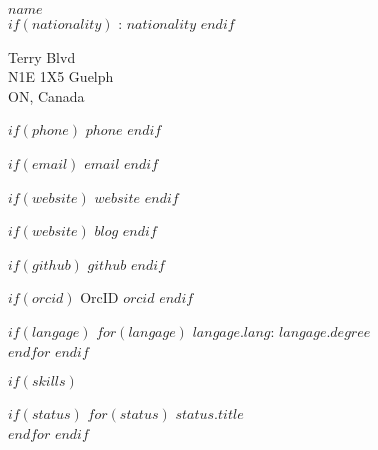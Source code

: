 \documentclass[$fontsize$, letterpaper]{article}
\begin{document}
\begin{multicols}{2}

{\LARGE \textbf{$name$}}\\


$if(nationality)$
: $nationality$
$endif$

\vspace*{.1cm}

\faHome {} Terry Blvd \\ \hspace*{.6cm} N1E 1X5 Guelph \\ \hspace*{.6cm} ON, Canada

$if(phone)$
\faPhone \quad $phone$
$endif$

$if(email)$
\faEnvelope \quad \href{mailto:$email$}{$email$}
$endif$

$if(website)$
\faGlobe \quad \href{http://$website$}{$website$}
$endif$

$if(website)$
\faGlobe \quad \href{http://$blog$}{$blog$}
$endif$

$if(github)$
\faGithub \quad \href{https://github.com/$github$}{$github$}
$endif$

$if(orcid)$
OrcID \quad \href{http://orcid.org/$orcid$}{$orcid$}
$endif$

\vspace{.2cm}


$if(langage)$
$for(langage)$
\textbf{$langage.lang$}: $langage.degree$ \\
$endfor$
$endif$


$if(skills)$

\columnbreak


$if(status)$
$for(status)$
{\large\textbf{$status.title$}} \\
$endfor$
$endif$

%




\end{multicols}
\end{document}
